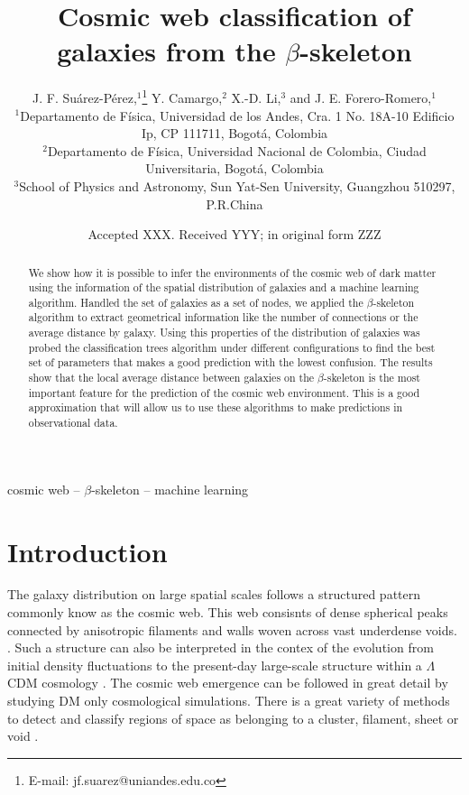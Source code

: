 \documentclass[usenatbib]{mnras}
\title[The $\beta$-skeleton and the T-web]{Cosmic web classification of galaxies from the $\beta$-skeleton}
\author[J. F. Su\'arez-P\'erez et al.]{
J. F. Su\'arez-P\'erez,$^{1}$\thanks{E-mail: jf.suarez@uniandes.edu.co}
Y. Camargo,$^{2}$ 
X.-D. Li,$^{3}$
and J. E. Forero-Romero,$^{1}$
\\
$^{1}$Departamento de F\'isica, Universidad de los Andes, Cra. 1 No. 18A-10 Edificio Ip, CP 111711, Bogot\'a, Colombia\\
$^{2}$Departamento de F\'isica, Universidad Nacional de Colombia, Ciudad Universitaria, Bogot\'a, Colombia\\
$^{3}$School of Physics and Astronomy, Sun Yat-Sen University, Guangzhou 510297, P.R.China\\
}
\date{Accepted XXX. Received YYY; in original form ZZZ}
\begin{document}
\label{firstpage}
\pagerange{\pageref{firstpage}--\pageref{lastpage}}
\maketitle

\begin{abstract}
We show how it is possible to infer the environments of the cosmic web
of dark matter using the information of the spatial distribution of
galaxies and a machine learning algorithm. 
Handled the set of galaxies
as a set of nodes, we applied the $\beta$-skeleton algorithm to
extract geometrical information like the number of connections or the
average distance by galaxy. 
Using this properties of the distribution
of galaxies was probed the classification trees algorithm under
different configurations to find the best set of parameters that makes
a good prediction with the lowest confusion. 
The results show that the
local average distance between galaxies on the $\beta$-skeleton is the
most important feature for the prediction of the cosmic web
environment. 
This is a good approximation that will allow us to use
these algorithms to make predictions in observational data. 
\end{abstract}

\begin{keywords}
cosmic web -- $\beta$-skeleton -- machine learning
\end{keywords}


\section{Introduction}

The galaxy distribution on large spatial scales follows a structured 
pattern commonly know as the cosmic web. 
This web consisnts of dense spherical peaks connected by
anisotropic filaments and walls woven across vast underdense voids. 
\citep{1996Bond}. 
Such a structure can also be interpreted in the contex of 
the evolution from initial density fluctuations to the present-day 
large-scale structure within a $\Lambda$CDM cosmology \citep{1987White}. 
The cosmic web emergence can be followed in great detail by studying DM only
cosmological simulations.
There is a great variety of methods to detect and classify regions of
space as belonging to a cluster, filament, sheet or void
\citep{2018Libeskind}. 
\end{document}
